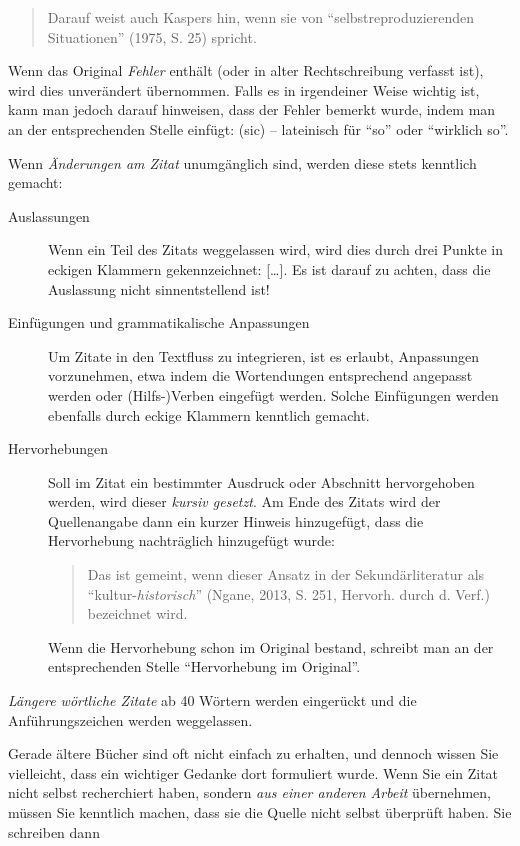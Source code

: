 \documentclass[ngerman,bibliography=totoc,oneside,12pt,a4paper]{scrbook}
\begin{document}
\begin{quote}
Darauf weist auch Kaspers hin, wenn sie von
\enquote{selbstreproduzierenden Situationen} (1975, S. 25) spricht.
\end{quote}

Wenn das Original \emph{Fehler} enthält (oder in alter Rechtschreibung
verfasst ist), wird dies unverändert übernommen. Falls es in irgendeiner
Weise wichtig ist, kann man jedoch darauf hinweisen, dass der Fehler
bemerkt wurde, indem man an der entsprechenden Stelle einfügt: (sic) --
lateinisch für \enquote{so} oder \enquote{wirklich so}.

Wenn \emph{Änderungen am Zitat} unumgänglich sind, werden diese stets
kenntlich gemacht:

\begin{description}
\item[Auslassungen]
Wenn ein Teil des Zitats weggelassen wird, wird dies durch drei Punkte
in eckigen Klammern gekennzeichnet: {[}\ldots{}{]}. Es ist darauf zu
achten, dass die Auslassung nicht sinnentstellend ist!
\item[Einfügungen und grammatikalische Anpassungen]
Um Zitate in den Textfluss zu integrieren, ist es erlaubt, Anpassungen
vorzunehmen, etwa indem die Wortendungen entsprechend angepasst werden
oder (Hilfs-)Verben eingefügt werden. Solche Einfügungen werden
ebenfalls durch eckige Klammern kenntlich gemacht.
\item[Hervorhebungen]
Soll im Zitat ein bestimmter Ausdruck oder Abschnitt hervorgehoben
werden, wird dieser \emph{kursiv gesetzt}. Am Ende des Zitats wird der
Quellenangabe dann ein kurzer Hinweis hinzugefügt, dass die Hervorhebung
nachträglich hinzugefügt wurde:

\begin{quote}
Das ist gemeint, wenn dieser Ansatz in der Sekundärliteratur als
\enquote{kultur-\emph{historisch}} (Ngane, 2013, S. 251, Hervorh. durch
d. Verf.) bezeichnet wird.
\end{quote}

Wenn die Hervorhebung schon im Original bestand, schreibt man an der
entsprechenden Stelle \enquote{Hervorhebung im Original}.
\end{description}

\emph{Längere wörtliche Zitate} ab 40 Wörtern werden eingerückt und die
Anführungszeichen werden weggelassen.

Gerade ältere Bücher sind oft nicht einfach zu erhalten, und dennoch
wissen Sie vielleicht, dass ein wichtiger Gedanke dort formuliert wurde.
Wenn Sie ein Zitat nicht selbst recherchiert haben, sondern \emph{aus
einer anderen Arbeit} übernehmen, müssen Sie kenntlich machen, dass sie
die Quelle nicht selbst überprüft haben. Sie schreiben dann
\end{document}
